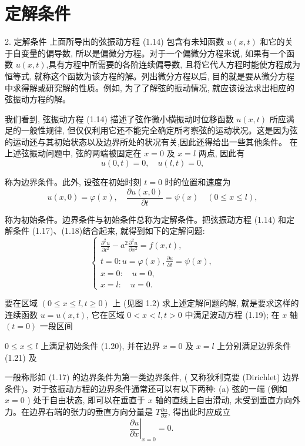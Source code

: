 \section{定解条件}

2. 定解条件 上面所导出的弦振动方程 (1.14) 包含有未知函数 $u(x, t)$ 和它的关于自变量的偏导数, 所以是偏微分方程。对于一个偏微分方程来说, 如果有一个函数 $u(x, t)$,具有方程中所需要的各阶连续偏导数, 且将它代人方程时能使方程成为恒等式, 就称这个函数为该方程的解。列出微分方程以后, 目的就是要从微分方程中求得解或研究解的性质。例如, 为了了解弦的振动情况, 就应该设法求出相应的弦振动方程的解。

我们看到, 弦振动方程 (1.14) 描述了弦作微小横振动时位移函数 $u(x, t)$ 所应满足的一般性规律, 但仅仅利用它还不能完全确定所考察弦的运动状况。这是因为弦的运动还与其初始状态以及边界所处的状况有关,因此还得给出一些其他条件。
在上述弦振动问题中, 弦的两端被固定在 $x=0$ 及 $x=l$ 两点, 因此有
$$
u(0, t)=0, \quad u(l, t)=0,
$$

称为边界条件。此外, 设弦在初始时刻 $t=0$ 时的位置和速度为
$$
u(x, 0)=\varphi(x), \quad \frac{\partial u(x, 0)}{\partial t}=\psi(x) \quad(0 \leqslant x \leqslant l),
$$

称为初始条件。边界条件与初始条件总称为定解条件。把弦振动方程 (1.14) 
和定解条件 (1.17)、(1.18)结合起来, 就得到如下的定解问题:
$$
\left\{\begin{array}{l}
	\frac{\partial^2 u}{\partial t^2}-a^2 \frac{\partial^2 u}{\partial x^2}=f(x, t), \\
	t=0: u=\varphi(x), \frac{\partial u}{\partial t}=\psi(x), \\
	x=0: \quad u=0, \\
	x=l: \quad u=0 .
\end{array}\right.
$$

要在区域 $(0 \leqslant x \leqslant l, t \geqslant 0)$ 上 (见图 1.2) 求上述定解问题的解, 就是要求这样的连续函数 $u=u(x, t)$, 它在区域 $0<x<l, t>0$ 中满足波动方程 (1.19); 在 $x$ 轴 $(t=0)$ 一段区间

$0 \leqslant x \leqslant l$ 上满足初始条件 (1.20), 并在边界 $x=0$ 及 $x=l$ 上分别满足边界条件 (1.21) 及

一般称形如 (1.17) 的边界条件为第一类边界条件, ( 又称狄利克要 (Dirichlet) 边界条件)。对于弦振动方程的边界条件通常还可以有以下两种:
(a) 弦的一端 (例如 $x=0$ ) 处于自由状态, 即可以在垂直于 $x$ 轴的直线上自由滑动, 未受到垂直方向外力。在边界右端的张力的垂直方向分量是 $T \frac{\partial u}{\partial x}$, 得出此时应成立
$$
\left.\frac{\partial u}{\partial x}\right|_{x=0}=0 \text {. }
$$

